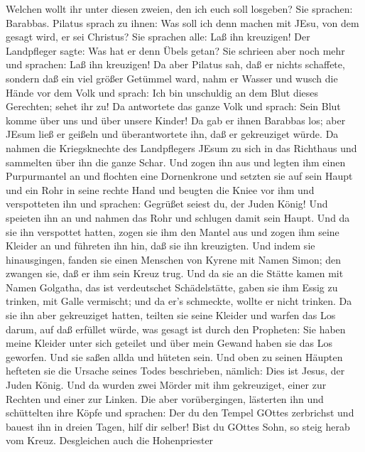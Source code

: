 Welchen wollt ihr unter diesen zweien, den ich euch soll losgeben? Sie
sprachen: Barabbas.  Pilatus sprach zu ihnen: Was soll ich
denn machen mit JEsu, von dem gesagt wird, er sei Christus? Sie sprachen
alle: Laß ihn kreuzigen!  Der Landpfleger sagte: Was hat er
denn Übels getan? Sie schrieen aber noch mehr und sprachen: Laß ihn
kreuzigen!  Da aber Pilatus sah, daß er nichts schaffete,
sondern daß ein viel größer Getümmel ward, nahm er Wasser und wusch die
Hände vor dem Volk und sprach: Ich bin unschuldig an dem Blut dieses
Gerechten; sehet ihr zu!  Da antwortete das ganze Volk und
sprach: Sein Blut komme über uns und über unsere Kinder! 
Da gab er ihnen Barabbas los; aber JEsum ließ er geißeln und
überantwortete ihn, daß er gekreuziget würde.  Da nahmen
die Kriegsknechte des Landpflegers JEsum zu sich in das Richthaus und
sammelten über ihn die ganze Schar.  Und zogen ihn aus und
legten ihm einen Purpurmantel an  und flochten eine
Dornenkrone und setzten sie auf sein Haupt und ein Rohr in seine rechte
Hand und beugten die Kniee vor ihm und verspotteten ihn und sprachen:
Gegrüßet seiest du, der Juden König!  Und speieten ihn an
und nahmen das Rohr und schlugen damit sein Haupt.  Und da
sie ihn verspottet hatten, zogen sie ihm den Mantel aus und zogen ihm
seine Kleider an und führeten ihn hin, daß sie ihn kreuzigten.
 Und indem sie hinausgingen, fanden sie einen Menschen von
Kyrene mit Namen Simon; den zwangen sie, daß er ihm sein Kreuz trug.
 Und da sie an die Stätte kamen mit Namen Golgatha, das ist
verdeutschet Schädelstätte,  gaben sie ihm Essig zu
trinken, mit Galle vermischt; und da er's schmeckte, wollte er nicht
trinken.  Da sie ihn aber gekreuziget hatten, teilten sie
seine Kleider und warfen das Los darum, auf daß erfüllet würde, was
gesagt ist durch den Propheten: Sie haben meine Kleider unter sich
geteilet und über mein Gewand haben sie das Los geworfen. 
Und sie saßen allda und hüteten sein.  Und oben zu seinen
Häupten hefteten sie die Ursache seines Todes beschrieben, nämlich: Dies
ist Jesus, der Juden König.  Und da wurden zwei Mörder mit
ihm gekreuziget, einer zur Rechten und einer zur Linken. 
Die aber vorübergingen, lästerten ihn und schüttelten ihre Köpfe
 und sprachen: Der du den Tempel GOttes zerbrichst und
bauest ihn in dreien Tagen, hilf dir selber! Bist du GOttes Sohn, so
steig herab vom Kreuz.  Desgleichen auch die Hohenpriester
